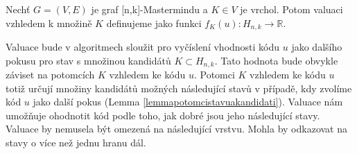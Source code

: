 







\begin{definice}[Valuace]
    Nechť $G = (V,E)$ je graf [n,k]-Mastermindu a $K \in V$ je vrchol. Potom valuaci vzhledem k množině $K$ definujeme jako funkci $f_K(u) \colon H_{n,k} \to \mathbb{R}$.
\end{definice}


Valuace bude v algoritmech sloužit pro vyčíslení vhodnosti kódu $u$ jako dalšího pokusu pro stav s množinou kandidátů $K\subset H_{n,k}$. Tato hodnota bude obvykle záviset na potomcích $K$ vzhledem ke kódu $u$. Potomci $K$ vzhledem ke kódu $u$ totiž určují množiny kandidátů možných následující stavů v případě, kdy zvolíme kód $u$ jako další pokus (Lemma \ref{lemmapotomcistavuakandidati}). Valuace nám umožňuje ohodnotit kód podle toho, jak dobré jsou jeho následující stavy. Valuace by nemusela být omezená na následující vrstvu. Mohla by odkazovat na stavy o více než jednu hranu dál.

